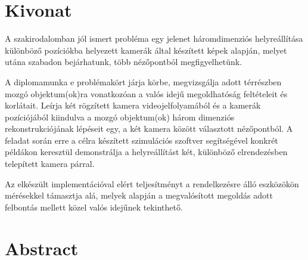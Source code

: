 
\hungarianParagraph

{\color{blue}
\chapter*{Kivonat}
}

A szakirodalomban jól ismert probléma egy jelenet háromdimenziós helyreállítása különböző pozíciókba helyezett kamerák által készített képek alapján, melyet utána szabadon bejárhatunk, több nézőpontból megfigyelhetünk.


A diplomamunka e problémakört járja körbe, megvizsgálja adott térrészben mozgó objektum(ok)ra vonatkozóan a valós idejű megoldhatóság feltételeit és korlátait. Leírja két rögzített kamera videojelfolyamából és a kamerák pozíciójából kiindulva a mozgó objektum(ok) három dimenziós rekonstrukciójának lépéseit egy, a két kamera között választott nézőpontból. A feladat során erre a célra készített szimulációs szoftver segítségével konkrét példákon keresztül demonstrálja a helyreállítást két, különböző elrendezésben telepített kamera párral.


Az elkészült implementációval elért teljesítményt a rendelkezésre álló eszközökön mérésekkel támasztja alá, melyek alapján a megvalósított megoldás adott felbontás mellett közel valós idejűnek tekinthető.

\vfill


\englishParagraph

{\color{red}
\chapter*{Abstract}
}

\vfill



\dolgozatnyelve
{}

\setcounter{romanPage}{\value{page}}
